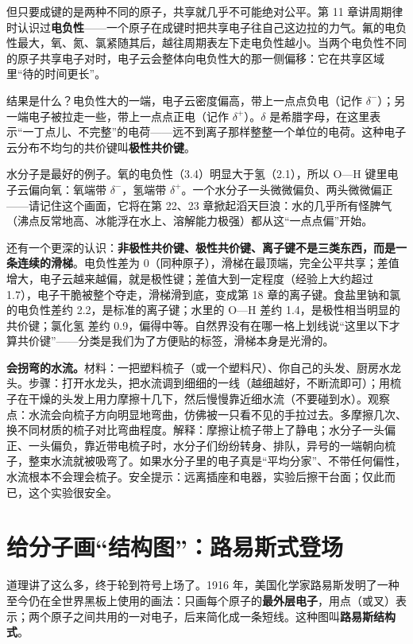 但只要成键的是两种不同的原子，共享就几乎不可能绝对公平。第 11 章讲周期律时认识过\textbf{电负性}——一个原子在成键时把共享电子往自己这边拉的力气。氟的电负性最大，氧、氮、氯紧随其后，越往周期表左下走电负性越小。当两个电负性不同的原子共享电子对时，电子云会整体向电负性大的那一侧偏移：它在共享区域里“待的时间更长”。

结果是什么？电负性大的一端，电子云密度偏高，带上一点点负电（记作 $\delta^{-}$）；另一端电子被拉走一些，带上一点点正电（记作 $\delta^{+}$）。$\delta$ 是希腊字母，在这里表示“一丁点儿、不完整”的电荷——远不到离子那样整整一个单位的电荷。这种电子云分布不均匀的共价键叫\textbf{极性共价键}。

水分子是最好的例子。氧的电负性（3.4）明显大于氢（2.1），所以 O—H 键里电子云偏向氧：氧端带 $\delta^{-}$，氢端带 $\delta^{+}$。一个水分子一头微微偏负、两头微微偏正——请记住这个画面，它将在第 22、23 章掀起滔天巨浪：水的几乎所有怪脾气（沸点反常地高、冰能浮在水上、溶解能力极强）都从这“一点点偏”开始。

还有一个更深的认识：\textbf{非极性共价键、极性共价键、离子键不是三类东西，而是一条连续的滑梯}。电负性差为 0（同种原子），滑梯在最顶端，完全公平共享；差值增大，电子云越来越偏，就是极性键；差值大到一定程度（经验上大约超过 1.7），电子干脆被整个夺走，滑梯滑到底，变成第 18 章的离子键。食盐里钠和氯的电负性差约 2.2，是标准的离子键；水里的 O—H 差约 1.4，是极性相当明显的共价键；氯化氢  差约 0.9，偏得中等。自然界没有在哪一格上划线说“这里以下才算共价键”——分类是我们为了方便贴的标签，滑梯本身是光滑的。

\begin{shiyan}
\textbf{会拐弯的水流。}材料：一把塑料梳子（或一个塑料尺）、你自己的头发、厨房水龙头。步骤：打开水龙头，把水流调到细细的一线（越细越好，不断流即可）；用梳子在干燥的头发上用力摩擦十几下，然后慢慢靠近细水流（不要碰到水）。观察点：水流会向梳子方向明显地弯曲，仿佛被一只看不见的手拉过去。多摩擦几次、换不同材质的梳子对比弯曲程度。解释：摩擦让梳子带上了静电；水分子一头偏正、一头偏负，靠近带电梳子时，水分子们纷纷转身、排队，异号的一端朝向梳子，整束水流就被吸弯了。如果水分子里的电子真是“平均分家”、不带任何偏性，水流根本不会理会梳子。安全提示：远离插座和电器，实验后擦干台面；仅此而已，这个实验很安全。
\end{shiyan}

\section{给分子画“结构图”：路易斯式登场}

道理讲了这么多，终于轮到符号上场了。1916 年，美国化学家路易斯发明了一种至今仍在全世界黑板上使用的画法：只画每个原子的\textbf{最外层电子}，用点（或叉）表示；两个原子之间共用的一对电子，后来简化成一条短线。这种图叫\textbf{路易斯结构式}。

